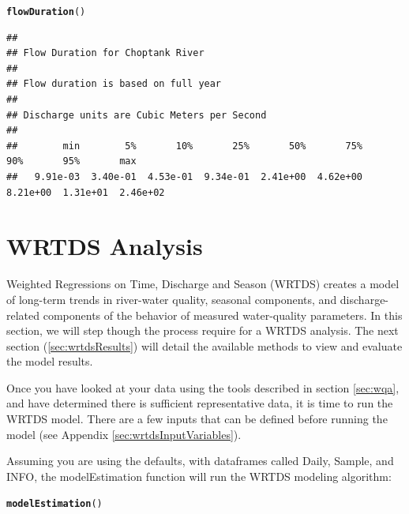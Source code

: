 \documentclass[a4paper,11pt]{article}\usepackage{graphicx, color}
\makeatletter
\newcommand{\hlfunctioncall}[1]{\textcolor[rgb]{0.501960784313725,0,0.329411764705882}{\textbf{#1}}}%
\newenvironment{kframe}{%
 \def\at@end@of@kframe{}%
 \ifinner\ifhmode%
  \def\at@end@of@kframe{\end{minipage}}%
  \begin{minipage}{\columnwidth}%
 \fi\fi%
 \def\FrameCommand##1{\hskip\@totalleftmargin \hskip-\fboxsep
 \colorbox{shadecolor}{##1}\hskip-\fboxsep
     \hskip-\linewidth \hskip-\@totalleftmargin \hskip\columnwidth}%
 \MakeFramed {\advance\hsize-\width
   \@totalleftmargin\z@ \linewidth\hsize
   \@setminipage}}%
 {\par\unskip\endMakeFramed%
 \at@end@of@kframe}
\newenvironment{knitrout}{}{} %
\makeatother
\begin{document}
\begin{knitrout}
\color{fgcolor}\begin{kframe}
\begin{alltt}
\hlfunctioncall{flowDuration}()
\end{alltt}
\begin{verbatim}
## 
## Flow Duration for Choptank River 
## 
## Flow duration is based on full year
## 
## Discharge units are Cubic Meters per Second
## 
##        min        5%       10%       25%       50%       75%       90%       95%       max
##   9.91e-03  3.40e-01  4.53e-01  9.34e-01  2.41e+00  4.62e+00  8.21e+00  1.31e+01  2.46e+02
\end{verbatim}
\end{kframe}
\end{knitrout}



\section{WRTDS Analysis}
\label{sec:wrtds}
Weighted Regressions on Time, Discharge and Season (WRTDS) creates a model of long-term trends in river-water quality, seasonal components, and discharge-related components of the behavior of measured water-quality parameters. In this section, we will step though the process require for a WRTDS analysis. The next section (\ref{sec:wrtdsResults}) will detail the available methods to view and evaluate the model results. 

Once you have looked at your data using the tools described in section \ref{sec:wqa}, and have determined there is sufficient representative data, it is time to run the WRTDS model. There are a few inputs that can be defined before running the model (see Appendix \ref{sec:wrtdsInputVariables}).

Assuming you are using the defaults, with dataframes called Daily, Sample, and INFO, the modelEstimation function will run the WRTDS modeling algorithm:

\begin{knitrout}
\color{fgcolor}\begin{kframe}
\begin{alltt}
\hlfunctioncall{modelEstimation}()
\end{alltt}
\end{kframe}
\end{knitrout}
\end{document}
